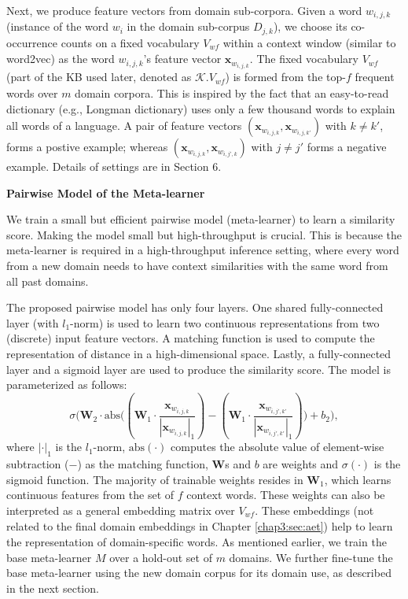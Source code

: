 Next, we produce feature vectors from domain sub-corpora.
Given a word $w_{i, j, k}$ (instance of the word $w_{i}$ in the domain sub-corpus $D_{j, k}$), we choose its co-occurrence counts on a fixed vocabulary $V_{\textit{wf}}$ within a context window (similar to word2vec) as the word $w_{i, j, k}$'s feature vector $\mathbf{x}_{w_{i, j, k}}$.
The fixed vocabulary $V_{\textit{wf}}$ (part of the KB used later, denoted as $\mathcal{K}.V_{\textit{wf}}$) is formed from the top-$f$ frequent words over $m$ domain corpora.
This is inspired by the fact that an easy-to-read dictionary (e.g., Longman dictionary) uses only a few thousand words to explain all words of a language.
A pair of feature vectors $(\mathbf{x}_{w_{i, j, k}}, \mathbf{x}_{w_{i, j, k'}})$ with $k \neq k'$, forms a postive example; 
whereas $(\mathbf{x}_{w_{i, j, k}}, \mathbf{x}_{w_{i, j', k}})$ with $j\neq j'$ forms a negative example.
Details of settings are in Section 6.

\textbf{Pairwise Model of the Meta-learner}

We train a small but efficient pairwise model (meta-learner) to learn a similarity score. 
Making the model small but high-throughput is crucial.
This is because the meta-learner is required in a high-throughput inference setting, where every word from a new domain needs to have context similarities with the same word from all past domains. 

The proposed pairwise model has only four layers. 
One shared fully-connected layer (with $l_1$-norm) is used to learn two continuous representations from two (discrete) input feature vectors.
A matching function is used to compute the representation of distance in a high-dimensional space.
Lastly, a fully-connected layer and a sigmoid layer are used to produce the similarity score.
The model is parameterized as follows:
\begin{equation}
\sigma \big( \bm{W}_2 \cdot \text{abs}\big( ( \bm{W}_1 \cdot \frac{\mathbf{x}_{w_{i, j, k}}}{ |\mathbf{x}_{w_{i, j, k}}|_1 }) - (\bm{W}_1 \cdot \frac{\mathbf{x}_{w_{i, j', k'}} }{ |\mathbf{x}_{w_{i, j', k'}}|_1 } ) \big) + b_2 \big) ,
\end{equation}
where $|\cdot|_1$ is the $l_1$-norm, $\text{abs}(\cdot)$ computes the absolute value of element-wise subtraction ($-$) as the matching function, $\bm{W}$s and $b$ are weights and $\sigma (\cdot)$ is the sigmoid function.
The majority of trainable weights resides in $\bm{W}_1$, which learns continuous features from the set of $f$ context words.
These weights can also be interpreted as a general embedding matrix over $V_{\textit{wf}}$. 
These embeddings (not related to the final domain embeddings in Chapter \ref{chap3:sec:aet}) help to learn the representation of domain-specific words.
As mentioned earlier, we train the base meta-learner $M$ over a hold-out set of $m$ domains.
We further fine-tune the base meta-learner using the new domain corpus for its domain use, as described in the next section.


